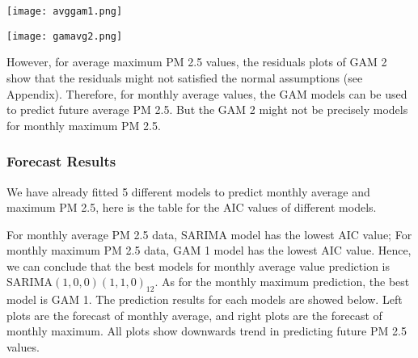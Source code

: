 \documentclass[11pt,]{article}
\begin{document}
\begin{minipage}{.45\linewidth}
\begin{flushleft}

{\texttt{[image: avggam1.png]}}

\end{flushleft} 
\end{minipage}
\hfill
\begin{minipage}{.45\linewidth}
\begin{flushright} 

{\texttt{[image: gamavg2.png]}}


\end{flushright} 
\end{minipage}


However, for average maximum PM 2.5 values, the residuals plots of GAM 2 show that the residuals might not satisfied the normal assumptions (see Appendix). Therefore, for monthly average values, the GAM models can be used to predict future average PM 2.5. But the GAM 2 might not be precisely models for monthly maximum PM 2.5.

\subsubsection{Forecast Results}

We have already fitted 5 different models to predict monthly average and maximum PM 2.5, here is the table for the AIC values of different models.


\begin{table}
\end{table}

For monthly average PM 2.5 data, SARIMA model has the lowest AIC value; For monthly maximum PM 2.5 data, GAM 1 model has the lowest AIC value. Hence, we can conclude that the best models for monthly average value prediction is SARIMA$(1,0,0)(1,1,0)_{12}$. As for the monthly maximum prediction, the best model is GAM 1. The prediction results for each models are showed below. Left plots are the forecast of monthly average, and right plots are the forecast of monthly maximum. All plots show downwards trend in predicting future PM 2.5 values.
\end{document}
